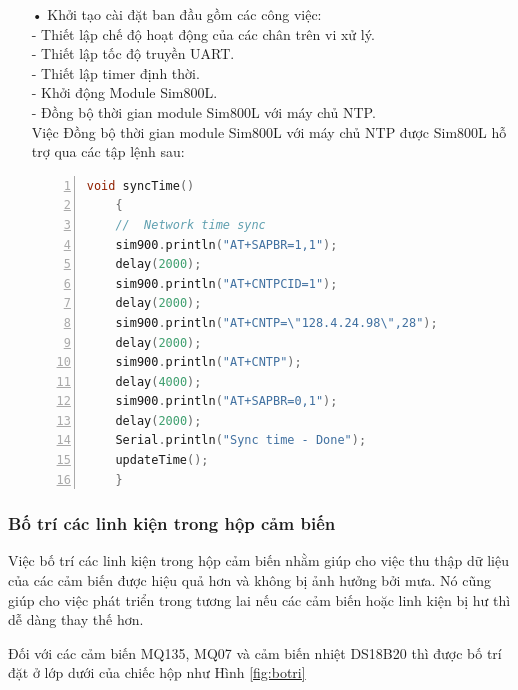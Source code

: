 \begin{itemize}
	\item[•]Khởi tạo cài đặt ban đầu gồm các công việc: \\
	- Thiết lập chế độ hoạt động của các chân trên vi xử lý.\\
	- Thiết lập tốc độ truyền UART.\\
	- Thiết lập timer định thời.\\
	- Khởi động Module Sim800L.\\
	- Đồng bộ thời gian module Sim800L với máy chủ NTP.\\
	Việc Đồng bộ thời gian module Sim800L với máy chủ NTP được Sim800L hỗ trợ qua các tập lệnh sau:
	\begin{lstlisting}[numbers=left,firstnumber=1,language=C]
	void syncTime()
	{
	//  Network time sync
	sim900.println("AT+SAPBR=1,1");
	delay(2000);
	sim900.println("AT+CNTPCID=1");
	delay(2000);
	sim900.println("AT+CNTP=\"128.4.24.98\",28");
	delay(2000);
	sim900.println("AT+CNTP");
	delay(4000);  
	sim900.println("AT+SAPBR=0,1");
	delay(2000);
	Serial.println("Sync time - Done");
	updateTime();
	}
	\end{lstlisting}
	
\end{itemize}



\subsubsection*{Bố trí các linh kiện trong hộp cảm biến}
Việc bố trí các linh kiện trong hộp cảm biến nhằm giúp cho việc thu thập dữ liệu của các cảm biến được hiệu quả hơn và không bị ảnh hưởng bởi mưa. Nó cũng giúp cho việc phát triển trong tương lai nếu các cảm biến hoặc linh kiện bị hư thì dễ dàng thay thế hơn.

Đối với các cảm biến MQ135, MQ07 và cảm biến nhiệt DS18B20 thì được bố trí đặt ở lớp dưới của chiếc hộp như Hình \ref{fig:botri}

